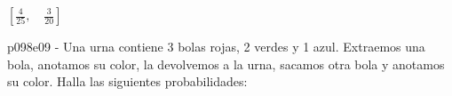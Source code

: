 \documentclass[spanish, 11pt]{exam}
\begin{document}
\begin{questions}
\begin{multicols}{2}
\begin{parts}
  \begin{solution}  $ \left [ \frac{4}{25}, \quad \frac{3}{20}\right ] $  \end{solution}
        \end{parts}
        \end{multicols}
        \question p098e09 - Una urna contiene 3 bolas rojas, 2 verdes y 1 azul. Extraemos una bola, anotamos su color, la devolvemos a
la urna, sacamos otra bola y anotamos su color. Halla las siguientes probabilidades:
        \begin{multicols}{2}
        \end{multicols}
        
    \end{questions}
    
\end{document}
